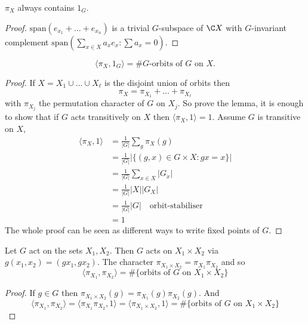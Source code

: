 \documentclass[a4paper]{article}
\theoremstyle{definition}
\begin{document}
\begin{lemma}
  \(\pi_X\) always contains \(1_G\).
\end{lemma}

\begin{proof}
  \(\text{span}(e_{x_1} + \dots + e_{x_n})\) is a trivial \(G\)-subspace of \(\C X\) with \(G\)-invariant complement \(\text{span}(\sum_{x \in X} a_x e_x: \sum a_x = 0)\).
\end{proof}

\begin{lemma}
  \[
    \langle \pi_X, 1_G \rangle = \# G\text{-orbits of \(G\) on \(X\)}.
  \]
\end{lemma}

\begin{proof}
  If \(X = X_1 \cup \dots \cup X_\ell\) is the disjoint union of orbits then
  \[
    \pi_X = \pi_{X_1} + \dots + \pi_{X_\ell}
  \]
  with \(\pi_{X_j}\) the permutation character of \(G\) on \(X_j\). So prove the lemma, it is enough to show that if \(G\) acts transitively on \(X\) then \(\langle \pi_X, 1 \rangle = 1\). Assume \(G\) is transitive on \(X\),
  \begin{align*}
    \langle \pi_X, 1 \rangle
    &= \frac{1}{|G|} \sum_g \pi_X(g) \\
    &= \frac{1}{|G|} |\{(g, x) \in G \times X: gx = x\}| \\
    &= \frac{1}{|G|} \sum_{x \in X} |G_x| \\
    &= \frac{1}{|G|} |X| |G_X| \\
    &= \frac{1}{|G|} |G| \quad \text{orbit-stabiliser} \\
    &= 1
  \end{align*}
  The whole proof can be seen as different ways to write fixed points of \(G\).
\end{proof}

\begin{lemma}
  Let \(G\) act on the sets \(X_1, X_2\). Then \(G\) acts on \(X_1 \times X_2\) via \(g(x_1, x_2) = (gx_1, gx_2)\). The character \(\pi_{X_1 \times X_2} = \pi_{X_1} \pi_{X_2}\) and so
  \[
    \langle \pi_{X_1}, \pi_{X_2} \rangle
    = \#\{\text{orbits of \(G\) on \(X_1 \times X_2\)}\}
  \]
\end{lemma}

\begin{proof}
  If \(g \in G\) then \(\pi_{X_1 \times X_2}(g) = \pi_{X_1}(g) \pi_{X_2}(g)\). And
  \[
    \langle \pi_{X_1}, \pi_{X_2} \rangle
    = \langle \pi_{X_1} \pi_{X_2}, 1 \rangle
    = \langle \pi_{X_1 \times X_2}, 1 \rangle
    = \#\{\text{orbits of \(G\) on \(X_1 \times X_2\)}\}
  \]
\end{proof}
\end{document}

